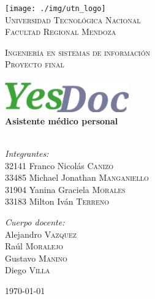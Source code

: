 \begin{titlepage}
\begin{center}

\texttt{[image: ./img/utn\_logo]}~\\[1cm]


{
\textsc{\LARGE Universidad Tecnológica Nacional\\
Facultad Regional Mendoza}\\[1.0cm]
}

\textsc{\Large Ingeniería en sistemas de información}\\[0.5cm]

\textsc{\large Proyecto final}\\[0.5cm]

\HRule \\[0.4cm]
\includegraphics[width=0.4\textwidth]{./img/logo}~\\[0.6cm]
{ \LARGE \bfseries Asistente médico personal \\[0.3cm] }
\HRule \\[1.5cm]

\noindent
\begin{minipage}[t]{0.7\textwidth}
\begin{flushleft} \large
\emph{Integrantes:}\\
{\scriptsize 32141} Franco Nicolás \textsc{Canizo}\\
{\scriptsize 33485} Michael Jonathan \textsc{Manganiello}\\
{\scriptsize 31904} Yanina Graciela \textsc{Morales}\\
{\scriptsize 33183} Milton Iván \textsc{Terreno}
\end{flushleft}
\end{minipage}%
\begin{minipage}[t]{0.3\textwidth}
\begin{flushright} \large
\emph{Cuerpo docente:} \\
Alejandro \textsc{Vazquez}\\
Raúl \textsc{Moralejo}\\
Gustavo \textsc{Manino}\\
Diego \textsc{Villa}
\end{flushright}
\end{minipage}

\vfill

{\large \today}

\end{center}
\end{titlepage}